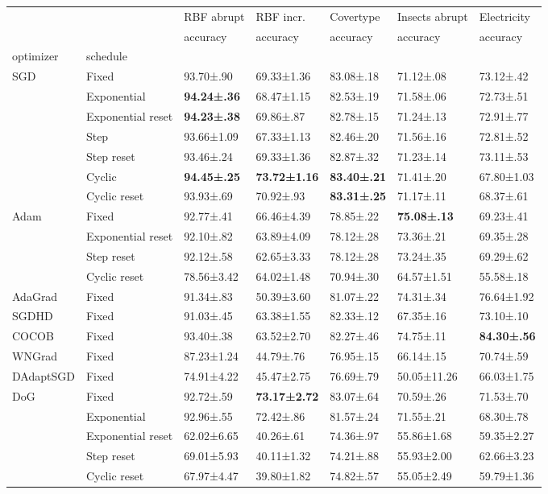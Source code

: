 \begin{tabular}{lllllll}
\toprule
 &  & RBF abrupt & RBF incr. & Covertype & Insects abrupt & Electricity \\
 &  & accuracy & accuracy & accuracy & accuracy & accuracy \\
optimizer & schedule &  &  &  &  &  \\
\midrule
\multirow[c]{7}{*}{SGD} & Fixed & 93.70±.90 & 69.33±1.36 & 83.08±.18 & 71.12±.08 & 73.12±.42 \\
 & Exponential & \bfseries 94.24±.36 & 68.47±1.15 & 82.53±.19 & 71.58±.06 & 72.73±.51 \\
 & Exponential reset & \bfseries 94.23±.38 & 69.86±.87 & 82.78±.15 & 71.24±.13 & 72.91±.77 \\
 & Step & 93.66±1.09 & 67.33±1.13 & 82.46±.20 & 71.56±.16 & 72.81±.52 \\
 & Step reset & 93.46±.24 & 69.33±1.36 & 82.87±.32 & 71.23±.14 & 73.11±.53 \\
 & Cyclic & \bfseries 94.45±.25 & \bfseries 73.72±1.16 & \bfseries 83.40±.21 & 71.41±.20 & 67.80±1.03 \\
 & Cyclic reset & 93.93±.69 & 70.92±.93 & \bfseries 83.31±.25 & 71.17±.11 & 68.37±.61 \\
\multirow[c]{4}{*}{Adam} & Fixed & 92.77±.41 & 66.46±4.39 & 78.85±.22 & \bfseries 75.08±.13 & 69.23±.41 \\
 & Exponential reset & 92.10±.82 & 63.89±4.09 & 78.12±.28 & 73.36±.21 & 69.35±.28 \\
 & Step reset & 92.12±.58 & 62.65±3.33 & 78.12±.28 & 73.24±.35 & 69.29±.62 \\
 & Cyclic reset & 78.56±3.42 & 64.02±1.48 & 70.94±.30 & 64.57±1.51 & 55.58±.18 \\
AdaGrad & Fixed & 91.34±.83 & 50.39±3.60 & 81.07±.22 & 74.31±.34 & 76.64±1.92 \\
SGDHD & Fixed & 91.03±.45 & 63.38±1.55 & 82.33±.12 & 67.35±.16 & 73.10±.10 \\
COCOB & Fixed & 93.40±.38 & 63.52±2.70 & 82.27±.46 & 74.75±.11 & \bfseries 84.30±.56 \\
WNGrad & Fixed & 87.23±1.24 & 44.79±.76 & 76.95±.15 & 66.14±.15 & 70.74±.59 \\
DAdaptSGD & Fixed & 74.91±4.22 & 45.47±2.75 & 76.69±.79 & 50.05±11.26 & 66.03±1.75 \\
\multirow[c]{5}{*}{DoG} & Fixed & 92.72±.59 & \bfseries 73.17±2.72 & 83.07±.64 & 70.59±.26 & 71.53±.70 \\
 & Exponential & 92.96±.55 & 72.42±.86 & 81.57±.24 & 71.55±.21 & 68.30±.78 \\
 & Exponential reset & 62.02±6.65 & 40.26±.61 & 74.36±.97 & 55.86±1.68 & 59.35±2.27 \\
 & Step reset & 69.01±5.93 & 40.11±1.32 & 74.21±.88 & 55.93±2.00 & 62.66±3.23 \\
 & Cyclic reset & 67.97±4.47 & 39.80±1.82 & 74.82±.57 & 55.05±2.49 & 59.79±1.36 \\
\bottomrule
\end{tabular}
